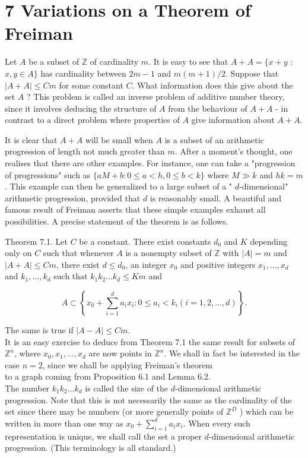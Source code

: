 \documentclass[10pt]{article}
\begin{document}
\section*{7 Variations on a Theorem of Freiman}
Let $A$ be a subset of $\mathbb{Z}$ of cardinality $m$. It is easy to see that $A+A=\{x+y$ : $x, y \in A\}$ has cardinality between $2 m-1$ and $m(m+1) / 2$. Suppose that $|A+A| \leqslant C m$ for some constant $C$. What information does this give about the set $A$ ? This problem is called an inverse problem of additive number theory, since it involves deducing the structure of $A$ from the behaviour of $A+A$ - in contrast to a direct problem where properties of $A$ give information about $A+A$.

It is clear that $A+A$ will be small when $A$ is a subset of an arithmetic progression of length not much greater than $m$. After a moment's thought, one realises that there are other examples. For instance, one can take a "progression of progressions" such as $\{a M+b: 0 \leqslant a<h, 0 \leqslant b<k\}$ where $M \gg k$ and $h k=m$. This example can then be generalized to a large subset of a " $d$-dimensional" arithmetic progression, provided that $d$ is reasonably small. A beautiful and famous result of Freiman asserts that these simple examples exhaust all possibilities. A precise statement of the theorem is as follows.

Theorem 7.1. Let $C$ be a constant. There exist constants $d_{0}$ and $K$ depending only on $C$ such that whenever $A$ is a nonempty subset of $\mathbb{Z}$ with $|A|=m$ and $|A+A| \leqslant C m$, there exist $d \leqslant d_{0}$, an integer $x_{0}$ and positive integers $x_{1}, \ldots, x_{d}$ and $k_{1}, \ldots, k_{d}$ such that $k_{1} k_{2} \ldots k_{d} \leqslant K m$ and

$$
A \subset\left\{x_{0}+\sum_{i=1}^{d} a_{i} x_{i}: 0 \leqslant a_{i}<k_{i}(i=1,2, \ldots, d)\right\} .
$$

The same is true if $|A-A| \leqslant C m$.\\
It is an easy exercise to deduce from Theorem 7.1 the same result for subsets of $\mathbb{Z}^{n}$, where $x_{0}, x_{1}, \ldots, x_{d}$ are now points in $\mathbb{Z}^{n}$. We shall in fact be interested in the case $n=2$, since we shall be applying Freiman's theorem\\
to a graph coming from Proposition 6.1 and Lemma 6.2.\\
The number $k_{1} k_{2} \ldots k_{d}$ is called the size of the $d$-dimensional arithmetic progression. Note that this is not necessarily the same as the cardinality of the set since there may be numbers (or more generally points of $\mathbb{Z}^{D}$ ) which can be written in more than one way as $x_{0}+\sum_{i=1}^{d} a_{i} x_{i}$. When every such representation is unique, we shall call the set a proper $d$-dimensional arithmetic progression. (This terminology is all standard.)
\end{document}
